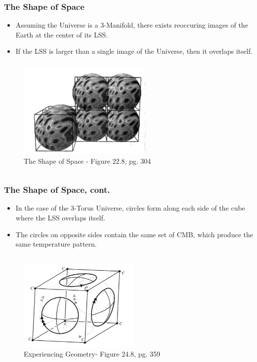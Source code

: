 \documentclass[13pt]{beamer}
\begin{document}
\begin{frame}
\frametitle{The Shape of Space}
  \begin{itemize}
    \item Assuming the Universe is a 3-Manifold, there exists reoccuring images of the Earth at the center of its LSS.
    \item If the LSS is larger than a single image of the Universe, then it overlaps itself.
  \end{itemize}

  \begin{columns}[c] %
     \centering
      \begin{figure}
        \includegraphics[height=4.5cm]{./img/LssIntersecting} %
        \caption{The Shape of Space - Figure 22.8, pg. 304}
      \end{figure}
  \end{columns}
\end{frame}

\begin{frame}
\frametitle{The Shape of Space, cont.}
  \begin{itemize}
    \item In the case of the 3-Torus Universe, circles form along each side of the cube where the LSS overlaps itself.
    \item The circles on opposite sides contain the same set of CMB, which produce the same temperature pattern.
  \end{itemize}

  \begin{columns}[c] %
     \centering
      \begin{figure}
        \includegraphics[height=4.5cm]{./img/shapeofspace} 
        \caption{Experiencing Geometry- Figure 24.8, pg. 359}
      \end{figure}
  \end{columns}
\end{frame}
\end{document}
